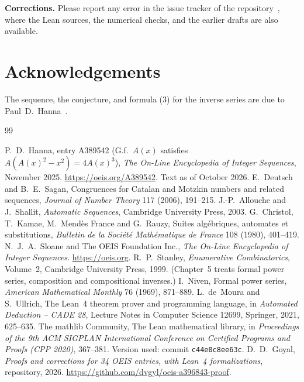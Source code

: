 \documentclass[11pt,a4paper]{article}
\theoremstyle{definition}
\theoremstyle{remark}
\newcommand{\para}[1]{\par\medskip\noindent\textbf{#1}\enspace}
\begin{document}
\para{Corrections.} Please report any error in the issue tracker of the repository~\cite{repo}, where the Lean
sources, the numerical checks, and the earlier drafts are also available.

\section*{Acknowledgements}
The sequence, the conjecture, and formula (3) for the inverse series are due to Paul~D.~Hanna~\cite{oeis}.

\begin{thebibliography}{99}\small
\raggedright
{} P.~D.~Hanna, entry A389542 (G.f.\ $A(x)$ satisfies $A(A(x)^2-x^2)=4A(x)^3$), \emph{The On-Line Encyclopedia of Integer Sequences}, November 2025. \url{https://oeis.org/A389542}. Text as of October 2026.
 E.~Deutsch and B.~E.~Sagan, Congruences for Catalan and Motzkin numbers and related sequences, \emph{Journal of Number Theory} 117 (2006), 191--215.
 J.-P.~Allouche and J.~Shallit, \emph{Automatic Sequences}, Cambridge University Press, 2003.
 G.~Christol, T.~Kamae, M.~Mend\`es France and G.~Rauzy, Suites alg\'ebriques, automates et substitutions, \emph{Bulletin de la Soci\'et\'e Math\'ematique de France} 108 (1980), 401--419.
 N.~J.~A.~Sloane and The OEIS Foundation Inc., \emph{The On-Line Encyclopedia of Integer Sequences}. \url{https://oeis.org}.
 R.~P.~Stanley, \emph{Enumerative Combinatorics}, Volume~2, Cambridge University Press, 1999. (Chapter~5 treats formal power series, composition and compositional inverses.)
 I.~Niven, Formal power series, \emph{American Mathematical Monthly} 76 (1969), 871--889.
 L.~de~Moura and S.~Ullrich, The Lean~4 theorem prover and programming language, in \emph{Automated Deduction -- CADE 28}, Lecture Notes in Computer Science 12699, Springer, 2021, 625--635.
 The mathlib Community, The Lean mathematical library, in \emph{Proceedings of the 9th ACM SIGPLAN International Conference on Certified Programs and Proofs (CPP 2020)}, 367--381. Version used: commit \texttt{c44e0c8ee63c}.
 D.~D.~Goyal, \emph{Proofs and corrections for 34 OEIS entries, with Lean~4 formalizations}, repository, 2026. \url{https://github.com/dvgyl/oeis-a396843-proof}.
\end{thebibliography}
\end{document}
